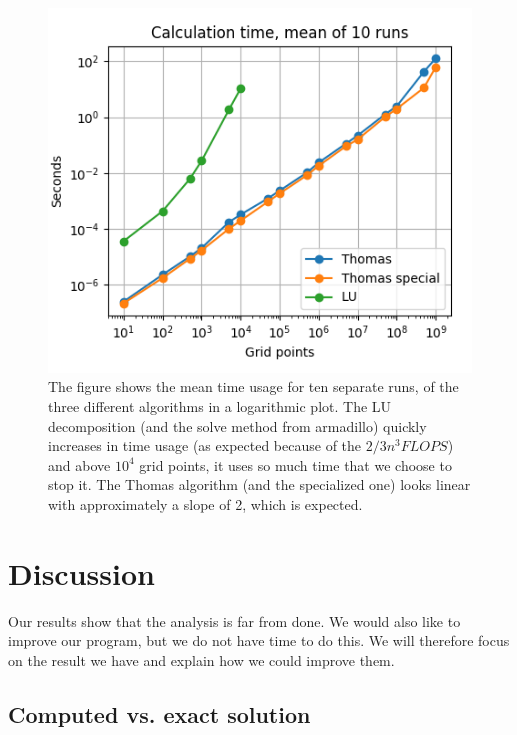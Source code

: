 \documentclass{emulateapj}
\begin{document}
\begin{figure}[h]
    \centering
    \includegraphics[scale=0.6]{algorithm_time.png}
    \caption{The figure shows the mean time usage for ten separate runs, of the three different algorithms in a logarithmic plot. The LU decomposition (and the solve method from armadillo) quickly increases in time usage (as expected because of the \(2/3n^{3} FLOPS\)) and above \(10^{4}\) grid points, it uses so much time that we choose to stop it. The Thomas algorithm (and the specialized one) looks linear with approximately a slope of 2, which is expected.}
    \label{fig:algorithm_time}
\end{figure}

\section{Discussion}

Our results show that the analysis is far from done. We would also like to improve our program, but we do not have time to do this. We will therefore focus on the result we have and explain how we could improve them.

\subsection{Computed vs. exact solution}
\end{document}

